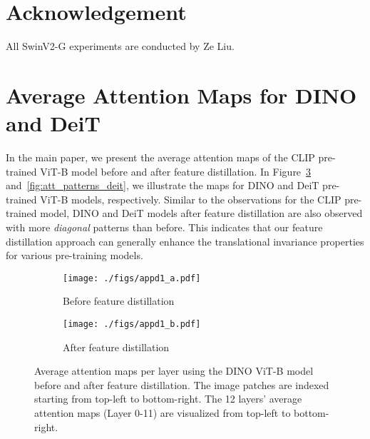 \documentclass{article}
\begin{document}
\section*{Acknowledgement}

All SwinV2-G experiments are conducted by Ze Liu.





\newpage

\appendix
\section{Average Attention Maps for DINO and DeiT}

In the main paper, we present the average attention maps of the CLIP pre-trained ViT-B model before and after feature distillation. In Figure~\ref{fig:att_patterns_dino} and~\ref{fig:att_patterns_deit}, we illustrate the maps for DINO and DeiT pre-trained ViT-B models, respectively. Similar to the observations for the CLIP pre-trained model, DINO and DeiT models after feature distillation are also observed with more \emph{diagonal} patterns than before. This indicates that our feature distillation approach can generally enhance the translational invariance properties for various pre-training models.


\begin{figure}[h]
\centering
\begin{subfigure}{.48\textwidth}
  \centering
  \texttt{[image: ./figs/appd1\_a.pdf]}
  \caption{Before feature distillation}
  \label{fig:att_patterns_a}
\end{subfigure}
\begin{subfigure}{.48\textwidth}
  \centering
  \texttt{[image: ./figs/appd1\_b.pdf]}
  \caption{After feature distillation}
  \label{fig:att_patterns_b}
\end{subfigure}
    \caption{Average attention maps per layer using the DINO ViT-B model before and after feature distillation. The image patches are indexed starting from top-left to bottom-right. The 12 layers' average attention maps (Layer 0-11) are visualized from top-left to bottom-right.}
    \label{fig:att_patterns_dino}
\end{figure}
\end{document}
